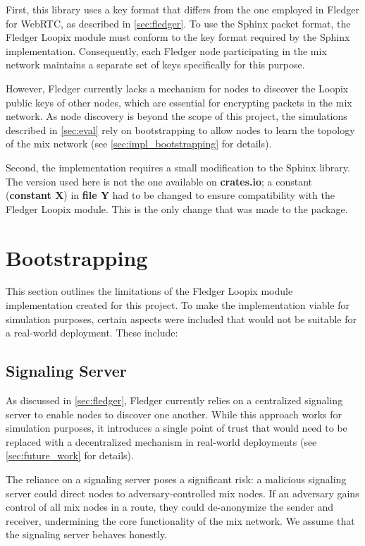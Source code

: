 \documentclass[a4paper,11pt,oneside]{report}
\begin{document}
First, this library uses a key format that differs from the one employed in Fledger for WebRTC, as described in \autoref{sec:fledger}. To use the Sphinx packet format, the Fledger Loopix module must conform to the key format required by the Sphinx implementation. Consequently, each Fledger node participating in the mix network maintains a separate set of keys specifically for this purpose.

However, Fledger currently lacks a mechanism for nodes to discover the Loopix public keys of other nodes, which are essential for encrypting packets in the mix network. As node discovery is beyond the scope of this project, the simulations described in \autoref{sec:eval} rely on bootstrapping  to allow nodes to learn the topology of the mix network (see \autoref{sec:impl_bootstrapping} for details).

Second, the implementation requires a small modification to the Sphinx library. The version used here is not the one available on \textbf{crates.io}; a constant (\textbf{constant X}) in \textbf{file Y} had to be changed to ensure compatibility with the Fledger Loopix module. This is the only change that was made to the package.

\section{Bootstrapping}
\label{sec:impl_bootstrapping}

This section outlines the limitations of the Fledger Loopix module implementation created for this project. To make the implementation viable for simulation purposes, certain aspects were included that would not be suitable for a real-world deployment. These include:

\subsection{Signaling Server}
As discussed in \autoref{sec:fledger}, Fledger currently relies on a centralized signaling server to enable nodes to discover one another. While this approach works for simulation purposes, it introduces a single point of trust that would need to be replaced with a decentralized mechanism in real-world deployments (see \autoref{sec:future_work} for details).

The reliance on a signaling server poses a significant risk: a malicious signaling server could direct nodes to adversary-controlled mix nodes. If an adversary gains control of all mix nodes in a route, they could de-anonymize the sender and receiver, undermining the core functionality of the mix network. We assume that the signaling server behaves honestly.
    
\end{document}
